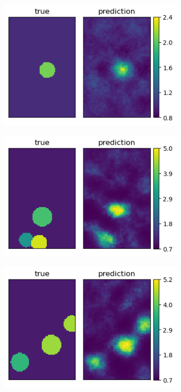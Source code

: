 \documentclass[10pt]{article}
\newcommand{\nhghalfwidth}{0.48\linewidth}
\newcommand{\nhgtotalheight}{4cm}
\begin{document}
%
\begin{figure}[!h]
  \centering
  \begin{subfigure}[c]{\nhghalfwidth}
    \centering
    \includegraphics[totalheight=\nhgtotalheight]{Figures/Results2/ex1/mu.png}
  \end{subfigure}
  \begin{subfigure}[c]{\nhghalfwidth}
    \centering
    \includegraphics[totalheight=\nhgtotalheight]{Figures/Results2/ex2/mu.png}
  \end{subfigure}
  \begin{subfigure}[c]{\nhghalfwidth}
    \centering
    \includegraphics[totalheight=\nhgtotalheight]{Figures/Results2/ex3/mu.png}

\end{subfigure}
\end{figure}
\end{document}
